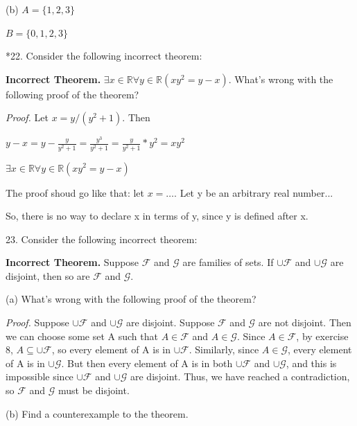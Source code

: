 \documentclass{article}
\begin{document}
\vspace{20pt}

(b) $A = \{1,2,3\}$

$B = \{0,1,2,3\}$

\vspace{30pt}

*22. Consider the following incorrect theorem:

\textbf{Incorrect Theorem.} $\exists x \in \mathbb{R} \forall y \in \mathbb{R}(x y^2 = y - x)$.
What's wrong with the following proof of the theorem?

\textit{Proof.} Let $x = y/(y^2 + 1)$. Then

$y - x = y - \frac{y}{y^2 + 1} = \frac{y^3}{y^2 + 1} = \frac{y}{y^2 + 1} * y^2 = x y^2$
\vspace{30pt}

$\exists x \in \mathbb{R} \forall y \in \mathbb{R}(x y^2 = y - x)$

The proof shoud go like that: let $x = \dots$. Let y be an arbitrary real number...

So, there is no way to declare x in terms of y, since y is defined after x.

\vspace{30pt}

23. Consider the following incorrect theorem:

\textbf{Incorrect Theorem.} Suppose $\mathcal{F}$ and $\mathcal{G}$ are families of sets. If $\cup \mathcal{F}$ and $\cup \mathcal{G}$ are disjoint, then so are $\mathcal{F}$ and $\mathcal{G}$.

\hspace{12pt}(a) What's wrong with the following proof of the theorem?

\textit{Proof.} Suppose $\cup \mathcal{F}$ and $\cup \mathcal{G}$ are disjoint. Suppose $\mathcal{F}$ and $\mathcal{G}$ are not disjoint. Then we can choose some set A such that $A \in \mathcal{F}$ and $A \in \mathcal{G}$.
Since $A \in \mathcal{F}$, by exercise 8, $A \subseteq \cup\mathcal{F}$, so every element of A is in
$\cup \mathcal{F}$. Similarly, since $A \in \mathcal{G}$, every element of A is in $\cup \mathcal{G}$. But then every element of A is in both $\cup \mathcal{F}$ and $\cup \mathcal{G}$, and this is impossible since
$\cup \mathcal{F}$ and $\cup \mathcal{G}$ are disjoint. Thus, we have reached a contradiction, so
$\mathcal{F}$ and $\mathcal{G}$ must be disjoint.

\hspace{12pt}(b) Find a counterexample to the theorem.
\vspace{30pt}
\end{document}

